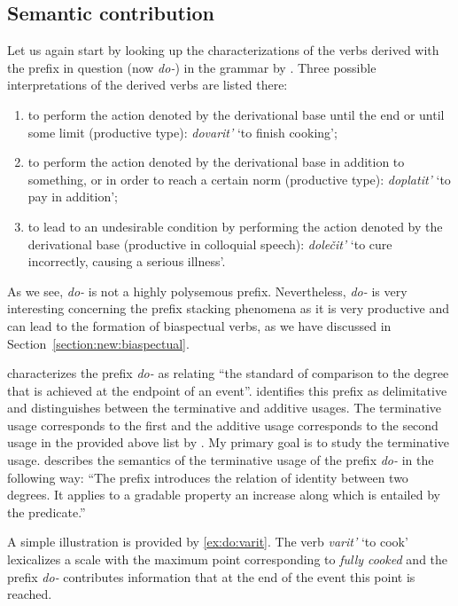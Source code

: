 \subsection{Semantic contribution}
Let us again start by looking up the characterizations of the verbs derived with the prefix in question (now \textit{do-}) in the grammar by \citet[357--358]{Shvedova:82}. Three possible interpretations of the derived verbs are listed there:
\begin{enumerate}
\item to perform the action denoted by the derivational base until the end or until some limit (productive type): \textit{dovarit'} `to finish cooking';
\item to perform the action denoted by the derivational base in addition to something, or in order to reach a certain norm (productive type): \textit{doplatit'} `to pay in addition';
\item to lead to an undesirable condition by performing the action denoted by the derivational base (productive in colloquial speech): \textit{dole\v{c}it'} `to cure incorrectly, causing a serious illness'.
\end{enumerate}

As we see, \textit{do-} is not a highly polysemous prefix. Nevertheless, \textit{do-} is very interesting concerning the prefix stacking phenomena as it is very productive and can lead to the formation of biaspectual verbs, as we have discussed in Section~\ref{section:new:biaspectual}. 

\citet[70]{Kagan:book} characterizes the prefix \textit{do-} as relating ``the standard of comparison to the degree that is achieved at the endpoint of an event''. \citet{Kagan:book} identifies this prefix as delimitative and distinguishes between the terminative and additive  usages. The terminative usage corresponds to the first and the additive usage corresponds to the second usage in the provided above list by \citet{Shvedova:82}. My primary goal is to study the terminative usage. \citet[72]{Kagan:book} describes the semantics of the terminative usage of the prefix \textit{do-} in the following way: ``The prefix introduces the relation of identity between two degrees. It applies to a gradable property an increase along which is entailed by the predicate.''

A simple illustration is provided by \ref{ex:do:varit}. The verb \textit{varit'} `to cook' lexicalizes a scale with the maximum point corresponding to \textit{fully cooked} and the prefix \textit{do-} contributes information that at the end of the event this point is reached. 

